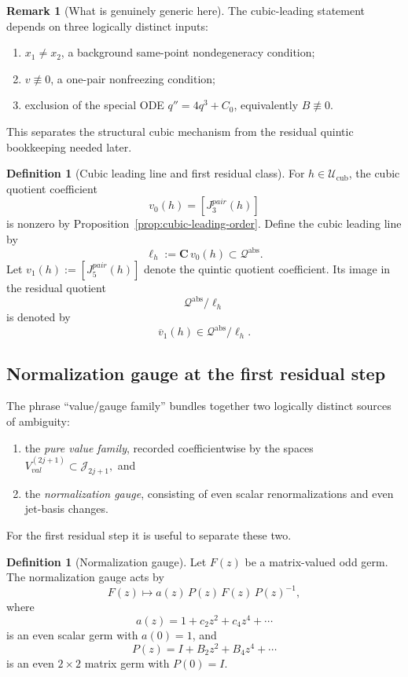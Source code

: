 \documentclass[11pt,a4paper]{amsart}
\def\val{val}%
\def\pair{pair}%
\theoremstyle{plain}
\theoremstyle{definition}
\newtheorem{definition}[theorem]{Definition}
\newtheorem{remark}[theorem]{Remark}
\newcommand{\val}{\mathrm{val}}
\newcommand{\pair}{\mathrm{pair}}
\newcommand{\Qabs}{\mathcal Q^{\mathrm{abs}}}
\begin{document}
\begin{remark}[What is genuinely generic here]
\label{rem:cubic-leading-genericity}
The cubic-leading statement depends on three logically distinct inputs:
\begin{enumerate}
\item $x_1\neq x_2$, a background same-point nondegeneracy condition;
\item $v\not\equiv 0$, a one-pair nonfreezing condition;
\item exclusion of the special ODE $q''=4q^3+C_0$, equivalently
$B\not\equiv 0$.
\end{enumerate}
This separates the structural cubic mechanism from the residual quintic
bookkeeping needed later.
\end{remark}

\begin{definition}[Cubic leading line and first residual class]
\label{def:cubic-leading-line}
For $h\in \mathcal U_{\mathrm{cub}}$, the cubic quotient coefficient
\[
v_0(h)=[J_3^{\pair}(h)]
\]
is nonzero by Proposition~\ref{prop:cubic-leading-order}. Define the cubic
leading line by
\[
\ell_h:=\mathbf C\,v_0(h)\subset \Qabs.
\]
Let $v_1(h):=[J_5^{\pair}(h)]$ denote the quintic quotient coefficient.
Its image in the residual quotient
\[
\Qabs/\ell_h
\]
is denoted by
\[
\overline v_1(h)\in \Qabs/\ell_h.
\]
\end{definition}

\subsection{Normalization gauge at the first residual step}

The phrase ``value/gauge family'' bundles together two logically distinct
sources of ambiguity:

\begin{enumerate}
\item the \emph{pure value family}, recorded coefficientwise by the spaces
$
V_{\val}^{(2j+1)}\subset \mathcal J_{2j+1},
$
and

\item the \emph{normalization gauge}, consisting of even scalar
renormalizations and even jet-basis changes.
\end{enumerate}

For the first residual step it is useful to separate these two.

\begin{definition}[Normalization gauge]
\label{def:normalization-gauge}
Let $F(z)$ be a matrix-valued odd germ. The normalization gauge acts by
\[
F(z)\longmapsto a(z)\,P(z)\,F(z)\,P(z)^{-1},
\]
where
\[
a(z)=1+c_2 z^2+c_4 z^4+\cdots
\]
is an even scalar germ with $a(0)=1$, and
\[
P(z)=I+B_2 z^2+B_4 z^4+\cdots
\]
is an even $2\times 2$ matrix germ with $P(0)=I$.
\end{definition}
\end{document}
